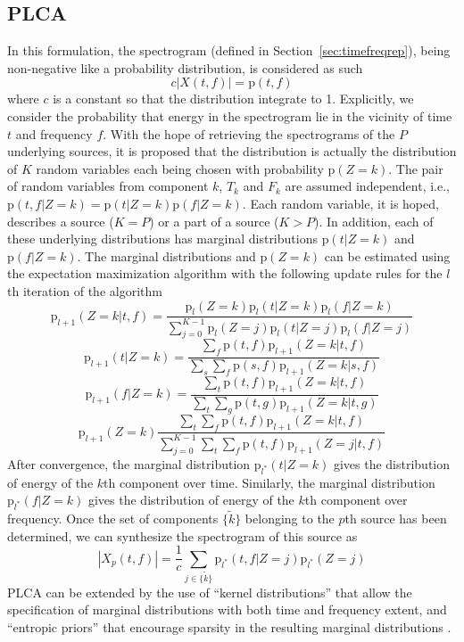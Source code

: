 \subsection{PLCA}

In this formulation, the spectrogram (defined in Section~\ref{sec:timefreqrep}),
being non-negative like a probability distribution, is considered as such
\[
    c|X(t,f)| = \mathrm{p} (t,f)
\]
where $c$ is a constant so that the distribution integrate to 1. Explicitly,
we consider the probability that energy in the spectrogram lie in the vicinity
of time $t$ and frequency $f$. With the hope of retrieving the spectrograms of
the $P$ underlying sources, it is proposed
that the distribution is actually the distribution of $K$ random variables each
being chosen with probability $\mathrm{p}(Z=k)$. The pair of random variables
from component $k$, $T_{k}$ and $F_{k}$ are assumed independent, i.e.,
$\mathrm{p}(t,f|Z=k)=\mathrm{p}(t|Z=k)\mathrm{p}(f|Z=k)$. Each random variable, it is
hoped, describes a source ($K=P$) or a part of a source ($K>P$). In addition,
each of these underlying distributions has marginal distributions $\mathrm{p}(t
| Z=k)$ and $\mathrm{p}(f | Z=k)$. The marginal distributions and
$\mathrm{p}(Z=k)$ can be estimated using the expectation maximization
algorithm
with the following update rules for the $l$th iteration of the
algorithm \cite{smaragdis2006probabilistic}
\[
    \mathrm{p}_{l+1}(Z=k | t, f)
    =
    \frac{\mathrm{p}_{l}(Z=k)\mathrm{p}_{l}(t|Z=k)\mathrm{p}_{l}(f|Z=k)}
    {\sum_{j=0}^{K-1}{\mathrm{p}_{l}(Z=j)\mathrm{p}_{l}(t|Z=j)\mathrm{p}_{l}(f|Z=j)}}
\]
\[
    \mathrm{p}_{l+1}(t|Z=k)
    =
    \frac{\sum_{f}\mathrm{p}(t,f)\mathrm{p}_{l+1}(Z=k|t,f)}
    {\sum_{s}\sum_{f}\mathrm{p}(s,f)\mathrm{p}_{l+1}(Z=k|s,f)}
\]
\[
    \mathrm{p}_{l+1}(f|Z=k)
    =
    \frac{\sum_{t}\mathrm{p}(t,f)\mathrm{p}_{l+1}(Z=k|t,f)}
    {\sum_{t}\sum_{g}\mathrm{p}(t,g)\mathrm{p}_{l+1}(Z=k|t,g)}
\]
\[
    \mathrm{p}_{l+1}(Z=k)
    \frac{\sum_{t}\sum_{f}\mathrm{p}(t,f)\mathrm{p}_{l+1}(Z=k|t,f)}
    {\sum_{j=0}^{K-1}\sum_{t}\sum_{f}\mathrm{p}(t,f)\mathrm{p}_{l+1}(Z=j|t,f)}
\]
After convergence, the marginal distribution $\mathrm{p}_{l^{\ast}}(t|Z=k)$
gives the distribution of energy of the $k$th component over time. Similarly, 
the marginal distribution $\mathrm{p}_{l^{\ast}}(f|Z=k)$
gives the distribution of energy of the $k$th component over frequency. Once the
set of components $\{ \tilde{k} \}$ belonging to the $p$th source has been
determined, we can synthesize the spectrogram of this source as
\[
    |X_{p}(t,f)| = \frac{1}{c}
    \sum_{j \in
    \{\tilde{k}\}}\mathrm{p}_{l^{\ast}}(t,f|Z=j)\mathrm{p}_{l^{\ast}}(Z=j)
\]
PLCA can be extended by the use of ``kernel distributions'' that allow the
specification of marginal distributions with both time and frequency extent, and
``entropic priors'' that encourage sparsity in the resulting marginal
distributions \cite{shashanka2008probabilistic}.

